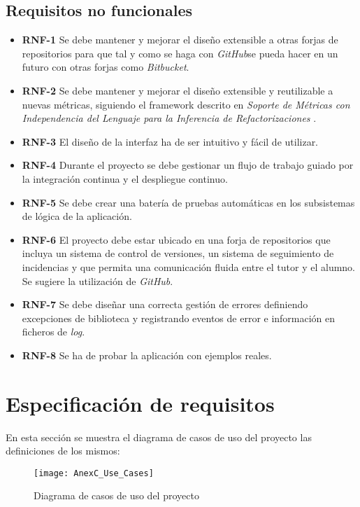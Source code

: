 \subsection{Requisitos no funcionales}

\begin{itemize}
	\item \textbf{RNF-1} Se debe mantener y mejorar el diseño extensible a otras forjas de repositorios para que tal y como se haga con \textit{GitHub}se pueda hacer en un futuro con otras forjas como \textit{Bitbucket}.
	\item \textbf{RNF-2} Se debe mantener y mejorar el diseño extensible y reutilizable a nuevas métricas, siguiendo el framework descrito en \textit{Soporte de Métricas con Independencia del Lenguaje para la Inferencia de Refactorizaciones} \cite{marticorena_sanchez_soporte_2005}.
	\item \textbf{RNF-3} El diseño de la interfaz ha de ser intuitivo y fácil de utilizar.
	\item \textbf{RNF-4} Durante el proyecto se debe gestionar un flujo de trabajo guiado por la integración continua y el despliegue continuo.
	\item \textbf{RNF-5} Se debe crear una batería de pruebas automáticas en los subsistemas de lógica de la aplicación.
	\item \textbf{RNF-6} El proyecto debe estar ubicado en una forja de repositorios que incluya un sistema de control de versiones, un sistema de seguimiento de incidencias y que permita una comunicación fluida entre el tutor y el alumno. Se sugiere la utilización de \textit{GitHub}.
	\item \textbf{RNF-7} Se debe diseñar una correcta gestión de errores definiendo excepciones de biblioteca y registrando eventos de error e información en ficheros de \textit{log}.
	\item \textbf{RNF-8} Se ha de probar la aplicación con ejemplos reales.
\end{itemize}

\section{Especificación de requisitos}

En esta sección se muestra el diagrama de casos de uso del proyecto las definiciones de los mismos:

\begin{figure}[!h]
	\centering
	\texttt{[image: AnexC\_Use\_Cases]}
	\caption{Diagrama de casos de uso del proyecto}
	\label{fig:AnexC_Use_Cases}
\end{figure}
\FloatBarrier

